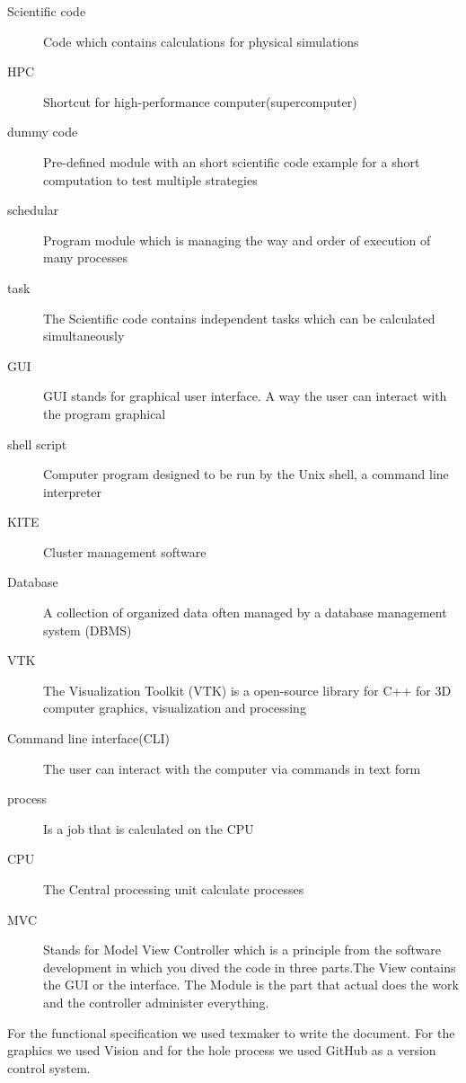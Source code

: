 \begin{description}
	\item[Scientific code] Code which contains calculations for physical simulations
	
	\item[HPC] Shortcut for high-performance computer(supercomputer)
	
	\item[dummy code] Pre-defined module with an short scientific code example for a short computation to test multiple strategies
	
	\item[schedular] Program module which is managing the way and order of execution of many processes
	
	\item[task] The Scientific code contains independent tasks which can be calculated simultaneously
	
	\item[GUI] GUI stands for graphical user interface. A way the user can interact with the program graphical
	
	\item[shell script] Computer program designed to be run by the Unix shell, a command line interpreter
	
	\item[KITE] Cluster management software
	
	\item[Database] A collection of organized data often managed by a database management system (DBMS)
	
	\item[VTK] The Visualization Toolkit (VTK)  is a open-source library for C++ for 3D computer graphics, visualization and processing
	
	\item[Command line interface(CLI)] The user can interact with the computer via commands in text form
	
	\item[process] Is a job that is calculated on the CPU
	
	\item[CPU] The Central processing unit calculate processes
	
	\item[MVC] Stands for Model View Controller which is a principle from the software development in which you dived the code in three parts.The View contains the GUI or the interface. The Module is the part that actual does the work and the controller administer everything.

\end{description}

For the functional specification we used texmaker to write the document. For the graphics we used Vision and for the hole process we used GitHub as a version control system.